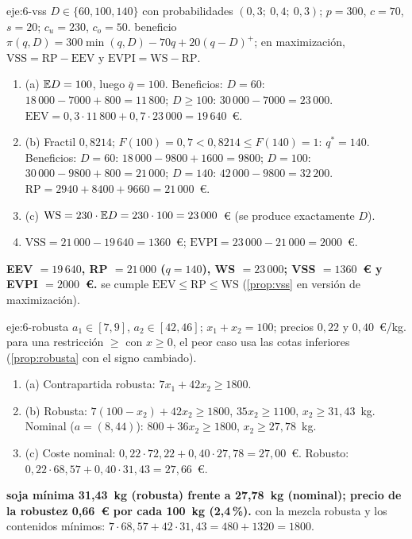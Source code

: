 \begin{solucion}{eje:6-vss}
\datos $D\in\{60,100,140\}$ con probabilidades $(0{,}3;\ 0{,}4;\ 0{,}3)$; $p=300$, $c=70$, $s=20$; $c_u=230$, $c_o=50$.
\planteamiento beneficio $\pi(q,D)=300\min(q,D)-70q+20(q-D)^{+}$; en maximización, $\mathrm{VSS}=\mathrm{RP}-\mathrm{EEV}$ y $\mathrm{EVPI}=\mathrm{WS}-\mathrm{RP}$.
\pasos
\begin{enumerate}[label=\arabic*.]
  \item (a) $\mathbb{E} D=100$, luego $\bar q=100$. Beneficios: $D=60$: $18\,000-7000+800=11\,800$; $D\ge 100$: $30\,000-7000=23\,000$. $\mathrm{EEV}=0{,}3\cdot 11\,800+0{,}7\cdot 23\,000=19\,640$~€.
  \item (b) Fractil $0{,}8214$; $F(100)=0{,}7<0{,}8214\le F(140)=1$: $q^{*}=140$. Beneficios: $D=60$: $18\,000-9800+1600=9800$; $D=100$: $30\,000-9800+800=21\,000$; $D=140$: $42\,000-9800=32\,200$. $\mathrm{RP}=2940+8400+9660=21\,000$~€.
  \item (c) $\mathrm{WS}=230\cdot\mathbb{E} D=230\cdot 100=23\,000$~€ (se produce exactamente $D$).
  \item $\mathrm{VSS}=21\,000-19\,640=1360$~€; $\mathrm{EVPI}=23\,000-21\,000=2000$~€.
\end{enumerate}
\resultado \textbf{EEV $=19\,640$, RP $=21\,000$ ($q=140$), WS $=23\,000$; VSS $=1360$~€ y EVPI $=2000$~€.}
\comprobacion se cumple $\mathrm{EEV}\le\mathrm{RP}\le\mathrm{WS}$ (\cref{prop:vss} en versión de maximización).
\end{solucion}

\begin{solucion}{eje:6-robusta}
\datos $a_1\in[7,9]$, $a_2\in[42,46]$; $x_1+x_2=100$; precios $0{,}22$ y $0{,}40$~€/kg.
\planteamiento para una restricción $\ge$ con $x\ge 0$, el peor caso usa las cotas inferiores (\cref{prop:robusta} con el signo cambiado).
\pasos
\begin{enumerate}[label=\arabic*.]
  \item (a) Contrapartida robusta: $7x_1+42x_2\ge 1800$.
  \item (b) Robusta: $7(100-x_2)+42x_2\ge 1800$, $35x_2\ge 1100$, $x_2\ge 31{,}43$~kg. Nominal ($a=(8,44)$): $800+36x_2\ge 1800$, $x_2\ge 27{,}78$~kg.
  \item (c) Coste nominal: $0{,}22\cdot 72{,}22+0{,}40\cdot 27{,}78=27{,}00$~€. Robusto: $0{,}22\cdot 68{,}57+0{,}40\cdot 31{,}43=27{,}66$~€.
\end{enumerate}
\resultado \textbf{soja mínima 31,43~kg (robusta) frente a 27,78~kg (nominal); precio de la robustez 0,66~€ por cada 100~kg (2,4\,\%).}
\comprobacion con la mezcla robusta y los contenidos mínimos: $7\cdot 68{,}57+42\cdot 31{,}43=480+1320=1800$.
\end{solucion}

